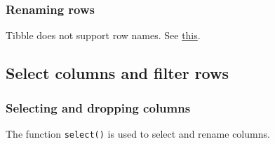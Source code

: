 \documentclass[
]{book}
\begin{document}
\hypertarget{renaming-rows}{%
\subsubsection{Renaming rows}\label{renaming-rows}}

Tibble does not support row names. See \href{tidyverse-r.html\#row-names}{this}.

\hypertarget{select-columns-and-filter-rows}{%
\subsection{Select columns and filter rows}\label{select-columns-and-filter-rows}}

\hypertarget{tr-filter-cols}{%
\subsubsection{Selecting and dropping columns}\label{tr-filter-cols}}

The function \texttt{select()} is used to select and rename columns.
\end{document}
